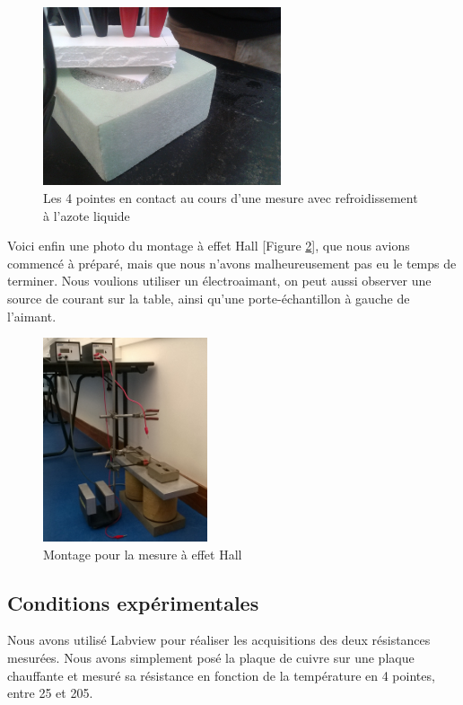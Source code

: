 \begin{figure}
  \begin{center}
		\includegraphics[width=7cm]{./images/photo5.jpg}
		\caption{Les 4 pointes en contact au cours d'une mesure avec refroidissement à l'azote liquide}
		\label{photo5}
	\end{center}
\end{figure}

Voici enfin une photo du montage à effet Hall [Figure \ref{photo_hall}], que nous avions commencé à préparé, mais que nous n'avons malheureusement pas eu le temps de terminer. Nous voulions utiliser un électroaimant, on peut aussi observer une source de courant sur la table, ainsi qu'une porte-échantillon à gauche de l'aimant.

\begin{figure}[!t]
  \begin{center}
		\includegraphics[height=6cm]{./images/photo_hall.jpg}
		\caption{Montage pour la mesure à effet Hall}
		\label{photo_hall}
	\end{center}
\end{figure}

\newpage

\subsection{Conditions expérimentales}
Nous avons utilisé Labview pour réaliser les acquisitions des deux résistances mesurées.
Nous avons simplement posé la plaque de cuivre sur une plaque chauffante et mesuré sa résistance en fonction de la température en 4 pointes, entre 25\celsius{} et 205\celsius{}.


